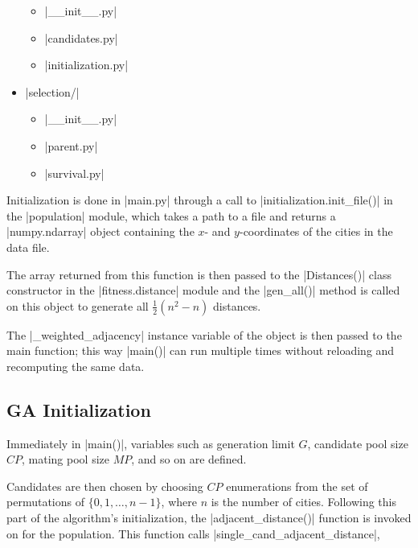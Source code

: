 \begin{multicols}{2}
\begin{itemize}[topsep=-12pt,leftmargin=22pt]
	\begin{itemize}[topsep=-1ex,leftmargin=12pt,itemsep=-.5ex]
		\item[\file] |__init__.py|
		\item[\file] |candidates.py|
		\item[\file] |initialization.py|
	\end{itemize}
	\item[\folder] |selection/|
	\begin{itemize}[topsep=-1ex,leftmargin=12pt,itemsep=-.5ex]
		\item[\file] |__init__.py|
		\item[\file] |parent.py|
		\item[\file] |survival.py|
	\end{itemize}
\end{itemize}
\end{multicols}
\egroup

Initialization is done in |main.py| through a call to |initialization.init_file()| in 
the |population| module, which takes a path to a file and returns a 
|numpy.ndarray| object containing the $x$- and $y$-coordinates of the 
cities in the data file.

{\small}

The array returned from this function is then passed to the |Distances()| 
class constructor in the |fitness.distance| module and the |gen_all()| 
method is called on this object to generate all $\frac{1}{2}(n^2-n)$
distances.

{\small}

The |_weighted_adjacency| instance variable of the object is then passed 
to the main function; this way |main()| can run multiple times without reloading 
and recomputing the same data.

\subsection{GA Initialization}
Immediately in |main()|, variables such as generation limit $G$, candidate pool size $CP$, 
mating pool size $MP$, and so on are defined. 

Candidates are then chosen by choosing $CP$ enumerations from the set of 
permutations of $\{0, 1, \ldots, n-1\}$, where $n$ is the number of cities.
Following this part of the algorithm's initialization, the |adjacent_distance()| function
is invoked on for the population. This function calls |single_cand_adjacent_distance|,

